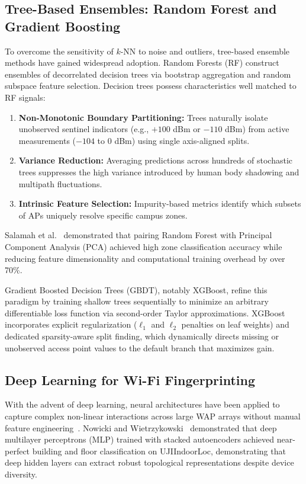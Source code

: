 \subsection{Tree-Based Ensembles: Random Forest and Gradient Boosting}
To overcome the sensitivity of $k$-NN to noise and outliers, tree-based ensemble methods have gained widespread adoption. Random Forests (RF) construct ensembles of decorrelated decision trees via bootstrap aggregation and random subspace feature selection. Decision trees possess characteristics well matched to RF signals:
\begin{enumerate}
    \item \textbf{Non-Monotonic Boundary Partitioning:} Trees naturally isolate unobserved sentinel indicators (e.g., $+100$ dBm or $-110$ dBm) from active measurements ($-104$ to $0$ dBm) using single axis-aligned splits.
    \item \textbf{Variance Reduction:} Averaging predictions across hundreds of stochastic trees suppresses the high variance introduced by human body shadowing and multipath fluctuations.
    \item \textbf{Intrinsic Feature Selection:} Impurity-based metrics identify which subsets of APs uniquely resolve specific campus zones.
\end{enumerate}
Salamah et al.~\cite{salamah2016enhanced} demonstrated that pairing Random Forest with Principal Component Analysis (PCA) achieved high zone classification accuracy while reducing feature dimensionality and computational training overhead by over 70\%.

Gradient Boosted Decision Trees (GBDT), notably XGBoost, refine this paradigm by training shallow trees sequentially to minimize an arbitrary differentiable loss function via second-order Taylor approximations. XGBoost incorporates explicit regularization ($\ell_1$ and $\ell_2$ penalties on leaf weights) and dedicated sparsity-aware split finding, which dynamically directs missing or unobserved access point values to the default branch that maximizes gain.

\subsection{Deep Learning for Wi-Fi Fingerprinting}
With the advent of deep learning, neural architectures have been applied to capture complex non-linear interactions across large WAP arrays without manual feature engineering~\cite{feng2022survey}.
Nowicki and Wietrzykowski~\cite{nowicki2017low} demonstrated that deep multilayer perceptrons (MLP) trained with stacked autoencoders achieved near-perfect building and floor classification on UJIIndoorLoc, demonstrating that deep hidden layers can extract robust topological representations despite device diversity.

